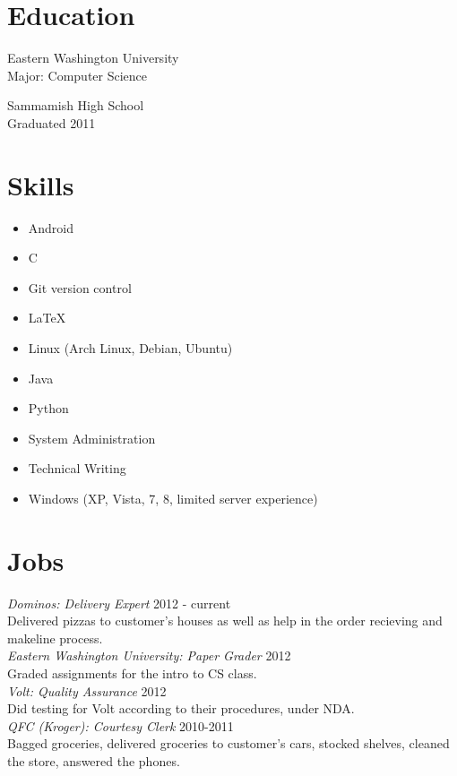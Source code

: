 \documentclass[line, margin, 12pt]{res}
\begin{document}
\address{12924 SE 26th ST \\ Bellevue WA, 98005 \\ +1 (425) 221-7761}
     
\begin{resume}
\section{Education}
Eastern Washington University \\
Major: Computer Science

Sammamish High School \\
Graduated 2011
     
\section{Skills}
\begin{itemize}
\item Android
\item C
\item Git version control
\item \LaTeX
\item Linux (Arch Linux, Debian, Ubuntu)
\item Java
\item Python
\item System Administration
\item Technical Writing
\item Windows (XP, Vista, 7, 8, limited server experience)
\end{itemize}
     
\section{Jobs}
\textit{Dominos: Delivery Expert} \hfill 2012 - current \\
Delivered pizzas to customer's houses as well as help in the order
recieving and makeline process. \\ [10pt]
\textit{Eastern Washington University: Paper Grader} \hfill 2012 \\
Graded assignments for the intro to CS class. \\ [10pt]
\textit{Volt: Quality Assurance} \hfill 2012 \\
Did testing for Volt according to their procedures, under NDA. \\ [10pt]
\textit{QFC (Kroger): Courtesy Clerk} \hfill 2010-2011 \\
Bagged groceries, delivered groceries to customer's cars, stocked
shelves, cleaned the store, answered the phones. \\ [10pt]


\end{resume}
\end{document}
